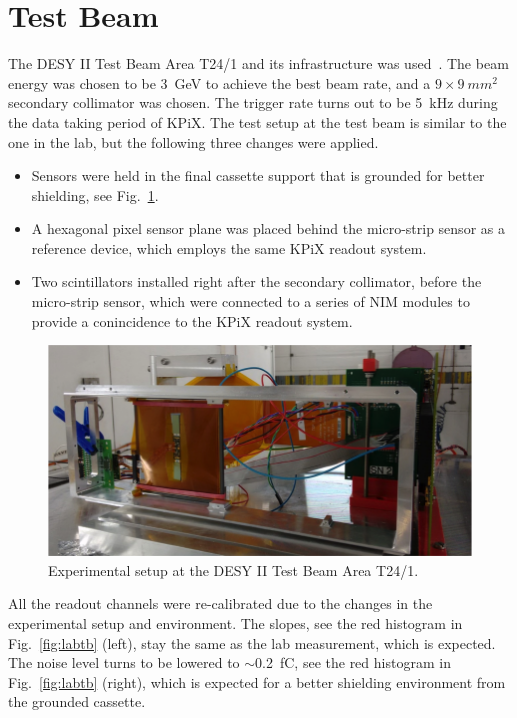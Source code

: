 \documentclass[conference]{IEEEtran}
\begin{document}
\section{Test Beam}
The DESY II Test Beam Area T24/1 and its infrastructure was used~\cite{desytbf}.
The beam energy was chosen to be \SI{3}{GeV} to achieve the best beam rate, and a $9\times\SI{9}{mm^2}$ secondary collimator was chosen.
The trigger rate turns out to be \SI{5}{kHz} during the data taking period of KPiX.
The test setup at the test beam is similar to the one in the lab, but the following three changes were applied.
\begin{itemize}
  \item Sensors were held in the final cassette support that is grounded for better shielding, see Fig.~\ref{fig:tb2}.
  \item A hexagonal pixel sensor plane was placed behind the micro-strip sensor as a reference device, which employs the same KPiX readout system.
  \item Two scintillators installed right after the secondary collimator, before the micro-strip sensor, which were connected to a series of NIM modules to provide a conincidence to the KPiX readout system.
\end{itemize}

\begin{figure}[!ht]%
  \centering
  \includegraphics[width=1.0\linewidth]{pics/tb_2.png}
  \caption{Experimental setup at the DESY II Test Beam Area T24/1.}%
\label{fig:tb2}%
\end{figure}

All the readout channels were re-calibrated due to the changes in the experimental setup and environment.
The slopes, see the red histogram in Fig.~\ref{fig:labtb} (left), stay the same as the lab measurement, which is expected.
The noise level turns to be lowered to $\sim$\SI{0.2}{fC}, see the red histogram in Fig.~\ref{fig:labtb} (right),
which is expected for a better shielding environment from the grounded cassette.
\end{document}

